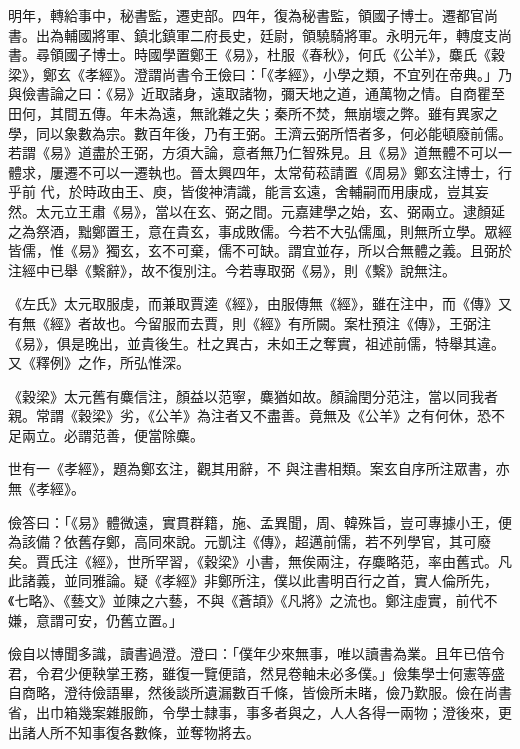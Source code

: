 \begin{pinyinscope}
 明年，轉給事中，秘書監，遷吏部。四年，復為秘書監，領國子博士。遷都官尚書。出為輔國將軍、鎮北鎮軍二府長史，廷尉，領驍騎將軍。永明元年，轉度支尚書。尋領國子博士。時國學置鄭王《易》，杜服《春秋》，何氏《公羊》，麋氏《穀梁》，鄭玄《孝經》。澄謂尚書令王儉曰：「《孝經》，小學之類，不宜列在帝典。」乃與儉書論之曰：《易》近取諸身，遠取諸物，彌天地之道，通萬物之情。自商瞿至田何，其間五傳。年未為遠，無訛雜之失；秦所不焚，無崩壞之弊。雖有異家之學，同以象數為宗。數百年後，乃有王弼。王濟云弼所悟者多，何必能頓廢前儒。若謂《易》道盡於王弼，方須大論，意者無乃仁智殊見。且《易》道無體不可以一體求，屢遷不可以一遷執也。晉太興四年，太常荀菘請置《周易》鄭玄注博士，行乎前
 代，於時政由王、庾，皆俊神清識，能言玄遠，舍輔嗣而用康成，豈其妄然。太元立王肅《易》，當以在玄、弼之間。元嘉建學之始，玄、弼兩立。逮顏延之為祭酒，黜鄭置王，意在貴玄，事成敗儒。今若不大弘儒風，則無所立學。眾經皆儒，惟《易》獨玄，玄不可棄，儒不可缺。謂宜並存，所以合無體之義。且弼於注經中已舉《繫辭》，故不復別注。今若專取弼《易》，則《繫》說無注。



 《左氏》太元取服虔，而兼取賈逵《經》，由服傳無《經》，雖在注中，而《傳》又有無《經》者故也。今留服而去賈，則《經》有所闕。案杜預注《傳》，王弼注《易》，俱是晚出，並貴後生。杜之異古，未如王之奪實，祖述前儒，特舉其違。又《釋例》之作，所弘惟深。



 《穀梁》太元舊有麋信注，顏益以范寧，麋猶如故。顏論閏分范注，當以同我者親。常謂《穀梁》劣，《公羊》為注者又不盡善。竟無及《公羊》之有何休，恐不足兩立。必謂范善，便當除麋。



 世有一《孝經》，題為鄭玄注，觀其用辭，不
 與注書相類。案玄自序所注眾書，亦無《孝經》。



 儉答曰：「《易》體微遠，實貫群籍，施、孟異聞，周、韓殊旨，豈可專據小王，便為該備？依舊存鄭，高同來說。元凱注《傳》，超邁前儒，若不列學官，其可廢矣。賈氏注《經》，世所罕習，《穀梁》小書，無俟兩注，存麋略范，率由舊式。凡此諸義，並同雅論。疑《孝經》非鄭所注，僕以此書明百行之首，實人倫所先，《七略》、《藝文》並陳之六藝，不與《蒼頡》《凡將》之流也。鄭注虛實，前代不嫌，意謂可安，仍舊立置。」



 儉自以博聞多識，讀書過澄。澄曰：「僕年少來無事，唯以讀書為業。且年已倍令君，令君少便鞅掌王務，雖復一覽便諳，然見卷軸未必多僕。」儉集學士何憲等盛自商略，澄待儉語畢，然後談所遺漏數百千條，皆儉所未睹，儉乃歎服。儉在尚書省，出巾箱幾案雜服飾，令學士隸事，事多者與之，人人各得一兩物；澄後來，更出諸人所不知事復各數條，並奪物將去。




\end{pinyinscope}
